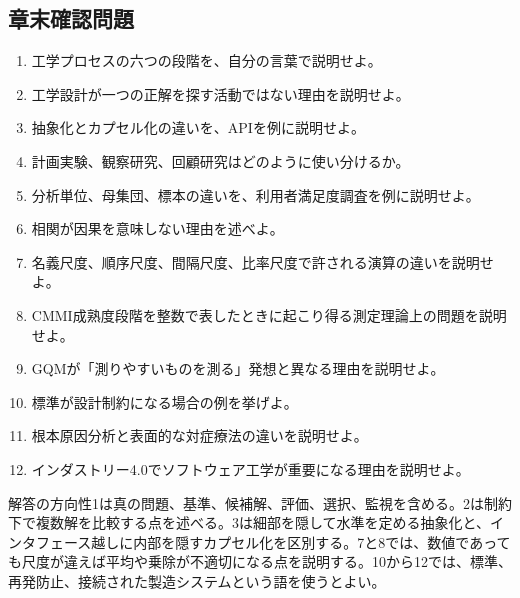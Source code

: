 \subsection{章末確認問題}
\begin{enumerate}[leftmargin=2em]
\item 工学プロセスの六つの段階を、自分の言葉で説明せよ。
\item 工学設計が一つの正解を探す活動ではない理由を説明せよ。
\item 抽象化とカプセル化の違いを、APIを例に説明せよ。
\item 計画実験、観察研究、回顧研究はどのように使い分けるか。
\item 分析単位、母集団、標本の違いを、利用者満足度調査を例に説明せよ。
\item 相関が因果を意味しない理由を述べよ。
\item 名義尺度、順序尺度、間隔尺度、比率尺度で許される演算の違いを説明せよ。
\item CMMI成熟度段階を整数で表したときに起こり得る測定理論上の問題を説明せよ。
\item GQMが「測りやすいものを測る」発想と異なる理由を説明せよ。
\item 標準が設計制約になる場合の例を挙げよ。
\item 根本原因分析と表面的な対症療法の違いを説明せよ。
\item インダストリー4.0でソフトウェア工学が重要になる理由を説明せよ。
\end{enumerate}
\begin{notebox}{解答の方向性}1は真の問題、基準、候補解、評価、選択、監視を含める。2は制約下で複数解を比較する点を述べる。3は細部を隠して水準を定める抽象化と、インタフェース越しに内部を隠すカプセル化を区別する。7と8では、数値であっても尺度が違えば平均や乗除が不適切になる点を説明する。10から12では、標準、再発防止、接続された製造システムという語を使うとよい。\end{notebox}
